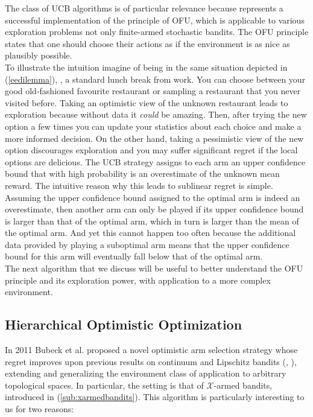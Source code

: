The class of \gls{UCB} algorithms is of particular relevance because represents a successful implementation of the principle of \gls{OFU}, which is applicable to various exploration problems not only finite-armed
stochastic bandits. The \gls{OFU} principle states that one should choose their actions as if the environment is as nice as plausibly possible. \\
To illustrate the intuition imagine of being in the same situation depicted in (\ref{eedilemma}), \ie, a standard lunch break from work. You can choose between your good old-fashioned favourite restaurant or sampling a restaurant that you never visited before. Taking an optimistic view of the unknown restaurant leads to exploration because without data it \emph{could} be amazing. Then, after trying the new option a few times you can update your statistics about each choice and make a more
informed decision. On the other hand, taking a pessimistic view of the new option discourages exploration and you may suffer significant regret if the local options are delicious. The \gls{UCB} strategy assigns to each arm an upper confidence bound  that with high probability is an overestimate of the unknown mean reward. The intuitive reason why
this leads to sublinear regret is simple. Assuming the upper confidence bound assigned to the optimal arm is indeed an overestimate, then another arm can only be played if its upper confidence bound is larger than that of the optimal arm, which in turn is larger than the mean of the optimal arm. And yet this cannot happen too often because the additional data provided by playing a suboptimal arm means that the upper confidence bound for this arm will eventually fall below that of the optimal arm.\\
The next algorithm that we discuss will be useful to better understand the \gls{OFU} principle and its exploration power, with application to a more complex environment.

\subsection{ Hierarchical Optimistic Optimization}
In 2011 Bubeck et al. \cite{bubeck2011x} proposed a novel optimistic arm selection strategy whose regret improves upon previous results on continuum and Lipschitz bandits (\eg, \cite{kleinberg2005nearly, kleinberg2008multi}), extending and generalizing the environment class of application to arbitrary topological spaces. In particular, the setting is that of $\mathcal{X}$-armed bandits, introduced in (\ref{sub:xarmedbandits}). This algorithm is particularly interesting to us for two reasons:

